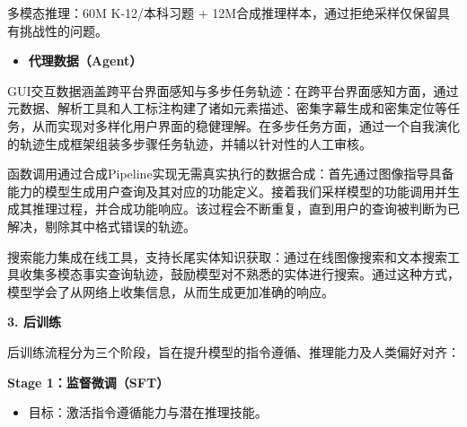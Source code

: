\documentclass[zihao=false,fontset=windows]{ctexart}
\begin{document}
多模态推理：60M K-12/本科习题 + 12M合成推理样本，通过\textcolor{feishuRed}{拒绝采样}仅保留具有挑战性的问题。\par

\begin{itemize}[label=\textcolor{feishuBlue}{\textbullet}]
\item \textcolor{feishuRed}{\textbf{代理数据（Agent）}}

\end{itemize}

GUI交互数据涵盖跨平台界面感知与多步任务轨迹：在跨平台界面感知方面，通过元数据、解析工具和人工标注构建了诸如元素描述、密集字幕生成和密集定位等任务，从而实现对多样化用户界面的稳健理解。在多步任务方面，通过一个自我演化的轨迹生成框架组装多步骤任务轨迹，并辅以针对性的人工审核。\par

函数调用通过合成Pipeline实现无需真实执行的数据合成：首先通过图像指导\textcolor{feishuRed}{具备能力的模型}生成用户查询及其对应的功能定义。接着我们采样模型的功能调用并生成其推理过程，并合成功能响应。该过程会不断重复，直到用户的查询被判断为已解决，剔除其中格式错误的轨迹。\par

搜索能力集成在线工具，支持长尾实体知识获取：通过在线图像搜索和文本搜索工具收集多模态事实查询轨迹，鼓励模型对不熟悉的实体进行搜索。通过这种方式，模型学会了从网络上收集信息，从而生成更加准确的响应。\par


\Needspace{3cm}\par\vspace{0.9em}\begin{tcolorbox}[enhanced,colback=headRed,boxrule=0pt,arc=4pt,boxsep=0pt,left=3pt,right=3pt,top=2pt,bottom=2pt,before skip=0pt,after skip=3pt]\bfseries \textcolor{feishuBlue}{3.} 后训练\end{tcolorbox}

后训练流程分为三个阶段，旨在提升模型的指令遵循、推理能力及人类偏好对齐：\par

\textbf{Stage 1：监督微调（SFT）}\par

\begin{itemize}[label=\textcolor{feishuBlue}{\textbullet}]
\item 目标：激活指令遵循能力与潜在推理技能。

\end{itemize}
\end{document}
